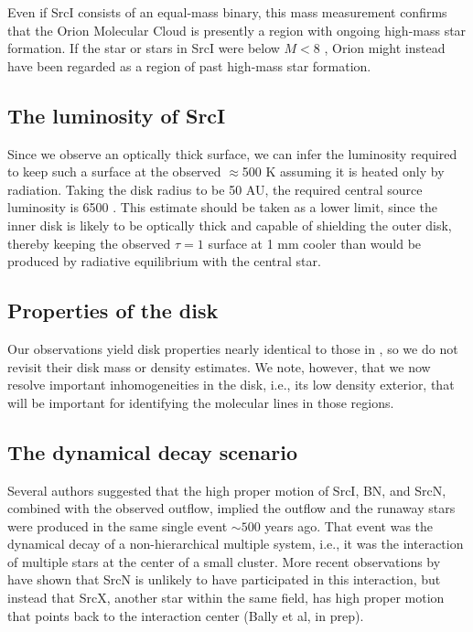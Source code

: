 \documentclass[twocolumn]{aastex61}
\newcommand{\sourcei}{SrcI\xspace}
\newcommand{\sourcen}{SrcN\xspace}
\newcommand{\sourcex}{SrcX\xspace}
\begin{document}
Even if \sourcei consists of an equal-mass binary, this mass measurement
confirms that the Orion Molecular Cloud is presently a region with ongoing
high-mass star formation.  If the star or stars in \sourcei were below $M<8$
\msun, Orion might instead have been regarded as a region of past high-mass
star formation.

\subsection{The luminosity of \sourcei}
Since we observe an optically thick surface, we can infer the luminosity
required to keep such a surface at the observed $\approx$500 K assuming
it is heated only by radiation.  Taking the disk radius to be 50 AU,
the required central source luminosity is 6500 \lsun.  This estimate
should be taken as a lower limit, since the inner disk is likely to be
optically thick and capable of shielding the outer disk, thereby
keeping the observed $\tau=1$ surface at 1 mm cooler than would
be produced by radiative equilibrium with the central star.

\subsection{Properties of the disk}
Our observations yield disk properties nearly identical to those in
\citet{Plambeck2016a}, so we do not revisit their disk mass or density
estimates.  We note, however, that we now resolve important inhomogeneities in
the disk, i.e., its low density exterior, that will be important for
identifying the molecular lines in those regions.

\subsection{The dynamical decay scenario}
Several authors \citep[][]{Gomez2008a,Goddi2011b,Bally2011a} suggested that
the high proper
motion of \sourcei, BN, and \sourcen, combined with the observed \hh outflow,
implied the outflow and the runaway stars were produced in the same single
event $\sim500$ years ago.  That event was the dynamical decay of a
non-hierarchical multiple system, i.e., it was the interaction of multiple
stars at the center of a small cluster.  More recent observations by
\citet{Luhman2017a} have shown that \sourcen is unlikely to have participated
in this interaction, but instead that \sourcex, another star within the same
field, has high proper motion that points back to the interaction center (Bally et al,
in prep).
\end{document}
